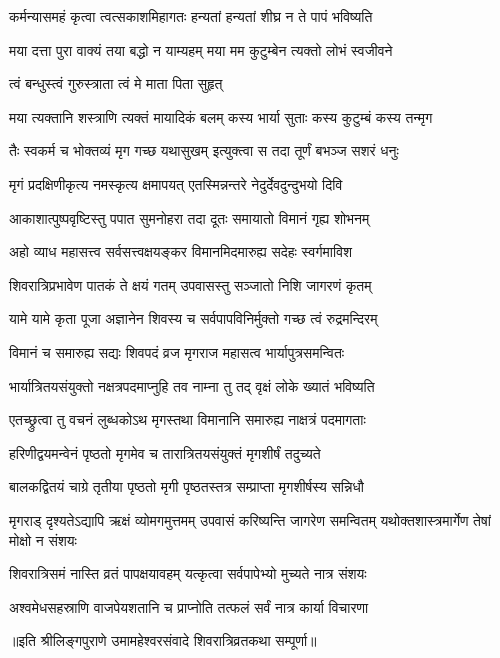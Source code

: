 
\twolineshloka
{कर्मन्यासमहं कृत्वा त्वत्सकाशमिहागतः}
{हन्यतां हन्यतां शीघ्र न ते पापं भविष्यति}%

\twolineshloka
{मया दत्ता पुरा वाक्यं तया बद्धो न याम्यहम्}
{मया मम कुटुम्बेन त्यक्तो लोभं स्वजीवने}%


\onelineshloka
{त्वं बन्धुस्त्वं गुरुस्त्राता त्वं मे माता पिता सुहृत्}%

\twolineshloka
{मया त्यक्तानि शस्त्राणि त्यक्तं मायादिकं बलम्}
{कस्य भार्या सुताः कस्य कुटुम्बं कस्य तन्मृग}%

\twolineshloka
{तैः स्वकर्म च भोक्तव्यं मृग गच्छ यथासुखम्}
{इत्युक्त्वा स तदा तूर्णं बभञ्ज सशरं धनुः}%

\twolineshloka
{मृगं प्रदक्षिणीकृत्य नमस्कृत्य क्षमापयत्}
{एतस्मिन्नन्तरे नेदुर्देवदुन्दुभयो दिवि}%

\twolineshloka
{आकाशात्पुष्पवृष्टिस्तु पपात सुमनोहरा}
{तदा दूतः समायातो विमानं गृह्य शोभनम्}%


\twolineshloka
{अहो व्याध महासत्त्व सर्वसत्त्वक्षयङ्कर}
{विमानमिदमारुह्य सदेहः स्वर्गमाविश}%

\twolineshloka
{शिवरात्रिप्रभावेण पातकं ते क्षयं गतम्}
{उपवासस्तु सञ्जातो निशि जागरणं कृतम्}%

\twolineshloka
{यामे यामे कृता पूजा अज्ञानेन शिवस्य च}
{सर्वपापविनिर्मुक्तो गच्छ त्वं रुद्रमन्दिरम्}%

\twolineshloka
{विमानं च समारुह्य सद्यः शिवपदं व्रज}
{मृगराज महासत्व भार्यापुत्रसमन्वितः}%

\twolineshloka
{भार्यात्रितयसंयुक्तो नक्षत्रपदमाप्नुहि}
{तव नाम्ना तु तद् वृक्षं लोके ख्यातं भविष्यति}%

\twolineshloka
{एतच्छ्रुत्वा तु वचनं लुब्धकोऽथ मृगस्तथा}
{विमानानि समारुह्य नाक्षत्रं पदमागताः}%

\twolineshloka
{हरिणीद्वयमन्वेनं पृष्ठतो मृगमेव च}
{तारात्रितयसंयुक्तं मृगशीर्षं तदुच्यते}%

\twolineshloka
{बालकद्वितयं चाग्रे तृतीया पृष्ठतो मृगी}
{पृष्ठतस्तत्र सम्प्राप्ता मृगशीर्षस्य सन्निधौ}%

\threelineshloka
{मृगराड् दृश्यतेऽद्यापि ऋक्षं व्योमगमुत्तमम्}
{उपवासं करिष्यन्ति जागरेण समन्वितम्}%
{यथोक्तशास्त्रमार्गेण तेषां मोक्षो न संशयः}

\twolineshloka
{शिवरात्रिसमं नास्ति व्रतं पापक्षयावहम्}
{यत्कृत्वा सर्वपापेभ्यो मुच्यते नात्र संशयः}%

\twolineshloka
{अश्वमेधसहस्राणि वाजपेयशतानि च}
{प्राप्नोति तत्फलं सर्वं नात्र कार्या विचारणा}%

॥इति श्रीलिङ्गपुराणे उमामहेश्वरसंवादे शिवरात्रिव्रतकथा सम्पूर्णा॥